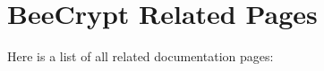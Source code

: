 \section{Bee\-Crypt Related Pages}
Here is a list of all related documentation pages:\begin{CompactList}
\item {}

\end{CompactList}
